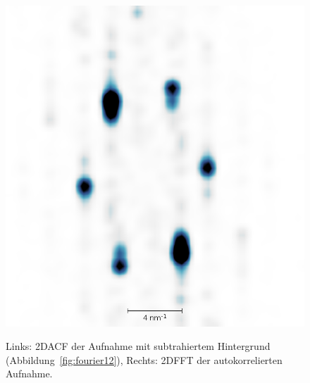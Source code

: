\begin{figure}
    \caption{Links: 2DACF der Aufnahme mit
        subtrahiertem Hintergrund (Abbildung~\ref{fig:fourier12}),
    Rechts: 2DFFT der autokorrelierten Aufnahme.}
    \includegraphics[width=0.7 \textwidth ]{pics/fourier5}
    \label{fig:fourier5}
\end{figure}



\clearpage

